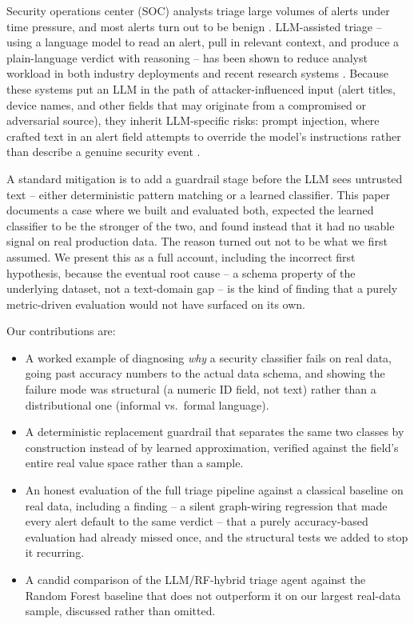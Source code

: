 \documentclass[conference]{IEEEtran}
\begin{document}
Security operations center (SOC) analysts triage large volumes of alerts under time pressure,
and most alerts turn out to be benign \cite{ndichu2026survey}. LLM-assisted triage -- using a
language model to read an alert, pull in relevant context, and produce a plain-language verdict
with reasoning -- has been shown to reduce analyst workload in both industry deployments
\cite{msseccopilot2024} and recent research systems \cite{cortex2025}. Because these systems put
an LLM in the path of attacker-influenced input (alert titles, device names, and other fields
that may originate from a compromised or adversarial source), they inherit LLM-specific risks:
prompt injection, where crafted text in an alert field attempts to override the model's
instructions rather than describe a genuine security event \cite{ferrag2024genai}.

A standard mitigation is to add a guardrail stage before the LLM sees untrusted text -- either
deterministic pattern matching or a learned classifier. This paper documents a case where we
built and evaluated both, expected the learned classifier to be the stronger of the two, and
found instead that it had no usable signal on real production data. The reason turned out not to
be what we first assumed. We present this as a full account, including the incorrect first
hypothesis, because the eventual root cause -- a schema property of the underlying dataset, not
a text-domain gap -- is the kind of finding that a purely metric-driven evaluation would not have
surfaced on its own.

Our contributions are:
\begin{itemize}
\item A worked example of diagnosing \emph{why} a security classifier fails on real data, going
past accuracy numbers to the actual data schema, and showing the failure mode was structural
(a numeric ID field, not text) rather than a distributional one (informal vs.\ formal language).
\item A deterministic replacement guardrail that separates the same two classes by construction
instead of by learned approximation, verified against the field's entire real value space rather
than a sample.
\item An honest evaluation of the full triage pipeline against a classical baseline on real data,
including a finding -- a silent graph-wiring regression that made every alert default to the same
verdict -- that a purely accuracy-based evaluation had already missed once, and the structural
tests we added to stop it recurring.
\item A candid comparison of the LLM/RF-hybrid triage agent against the Random Forest baseline
that does not outperform it on our largest real-data sample, discussed rather than omitted.
\end{itemize}
\end{document}
